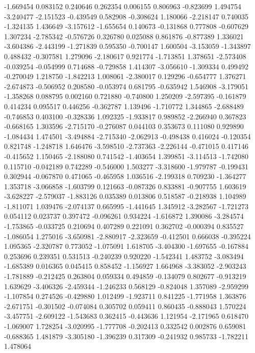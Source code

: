 -1.669454
0.083152
0.240646
0.262354
0.006155
0.806963
-0.823699
1.494754
-3.240477
-2.151523
-0.439549
0.582908
-0.308624
1.180066
-2.218147
0.740035
-1.324135
1.436649
-3.157612
-1.655654
0.140673
-0.131868
0.777808
-0.607629
1.307234
-2.785342
-0.576726
0.326780
0.025088
0.861876
-0.877389
1.336021
-3.604386
-2.443199
-1.271839
0.595350
-0.700147
1.600504
-3.153059
-1.343897
0.488432
-0.307581
1.279096
-2.180617
0.921774
-1.713851
1.378651
-2.573408
-0.039254
-0.054999
0.714688
-0.729858
1.414307
-3.056610
-1.309334
0.499492
-0.270049
1.218750
-1.842213
1.008061
-2.380017
0.129296
-0.654777
1.376271
-2.674873
-0.506952
0.208580
-0.053974
0.681795
-0.635942
1.546908
-3.179051
-1.358268
0.088795
0.002160
0.721880
-0.740800
1.250209
-2.597395
-0.161879
0.414234
0.095517
0.446256
-0.362787
1.139496
-1.710772
1.344865
-2.688489
-0.746853
0.403100
-0.328336
1.092325
-1.933817
0.989852
-2.266940
0.367823
-0.668165
1.303596
-2.715170
-0.276087
0.044103
0.353673
0.111080
0.929890
-1.084434
1.474501
-3.494884
-2.715340
-2.062913
-0.498438
0.416024
-0.120354
0.821748
-1.248718
1.646476
-3.598510
-2.737363
-2.226144
-0.471015
0.417146
-0.415652
1.150465
-2.188080
0.741542
-1.403654
1.399851
-3.114513
-1.742080
0.115710
-0.042189
0.742289
-0.546000
1.503277
-3.318600
-1.979787
-0.199431
0.302944
-0.067870
0.471065
-0.465958
1.036516
-2.199318
0.709230
-1.364277
1.353718
-3.066858
-1.603799
0.121663
-0.087326
0.833881
-0.907755
1.603619
-3.628227
-2.579037
-1.883126
0.035389
0.013806
0.518587
-0.218938
1.104989
-1.811071
1.039476
-2.074137
0.665995
-1.441645
1.345912
-3.282567
-1.721273
0.054112
0.023737
0.397472
-0.096261
0.934224
-1.616872
1.390086
-3.284574
-1.753865
-0.033725
0.210694
0.407289
0.221091
0.362702
-0.000394
0.835527
-1.086054
1.275016
-3.650981
-2.880917
-2.323659
-0.412501
0.666038
-0.395224
1.095365
-2.320787
0.773052
-1.075091
1.618705
-3.404300
-1.697655
-0.167884
0.253696
0.239351
0.531513
-0.240239
0.920220
-1.542341
1.483752
-3.083494
-1.685389
0.016365
0.045415
0.858452
-1.156927
1.664968
-3.383052
-2.903243
-1.781889
-0.212425
0.263804
0.059334
0.494859
-0.134079
0.802677
-0.913219
1.639629
-3.406326
-2.459344
-1.246233
0.568129
-0.824048
1.357089
-2.959299
-1.107854
0.274526
-0.429880
1.012499
-1.923711
0.841225
-1.771958
1.363876
-2.671751
-0.301502
-0.074084
0.305702
0.059411
0.860435
-0.888043
1.570224
-3.457751
-2.609122
-1.543683
0.362415
-0.443636
1.121954
-2.171965
0.618470
-1.069007
1.728254
-3.020995
-1.777708
-0.202413
0.332542
0.002876
0.659081
-0.688365
1.481879
-3.305180
-1.396239
0.317309
-0.241932
0.985733
-1.782211
1.478064
